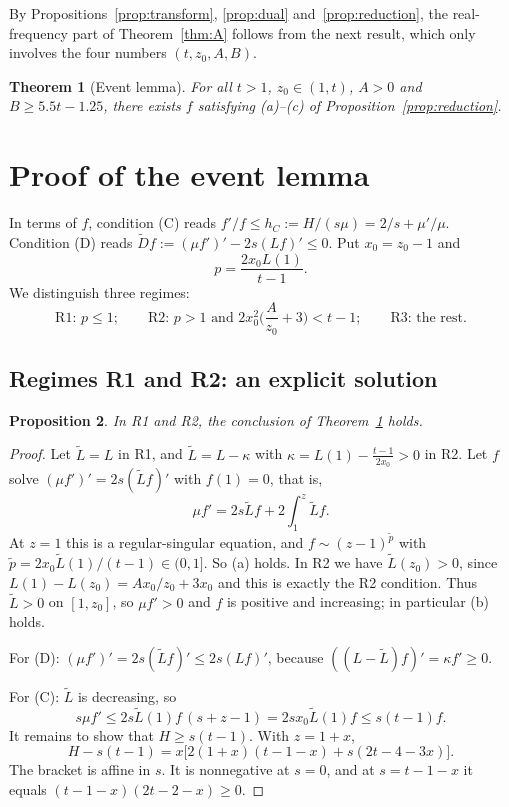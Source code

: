\documentclass[11pt]{amsart}
\newtheorem{theorem}{Theorem}[section]
\newtheorem{proposition}[theorem]{Proposition}
\theoremstyle{definition}
\theoremstyle{remark}
\numberwithin{equation}{section}
\begin{document}
By Propositions~\ref{prop:transform}, \ref{prop:dual} and~\ref{prop:reduction}, the real-frequency part of
Theorem~\ref{thm:A} follows from the next result, which only involves the four numbers $(t,z_0,A,B)$.

\begin{theorem}[Event lemma]\label{thm:event}
For all $t>1$, $z_0\in(1,t)$, $A>0$ and $B\ge5.5t-1.25$, there exists $f$ satisfying (a)--(c) of
Proposition~\ref{prop:reduction}.
\end{theorem}

\section{Proof of the event lemma}\label{sec:event}

In terms of $f$, condition (C) reads $f'/f\le h_C:=H/(s\mu)=2/s+\mu'/\mu$. Condition (D) reads
$\widetilde Df:=(\mu f')'-2s(Lf)'\le0$. Put $x_0=z_0-1$ and
\[
p=\frac{2x_0L(1)}{t-1}.
\]
We distinguish three regimes:
\[
\text{R1: }p\le1;\qquad\text{R2: }p>1\text{ and }2x_0^2\Big(\frac{A}{z_0}+3\Big)<t-1;\qquad\text{R3: the rest.}
\]

\subsection{Regimes R1 and R2: an explicit solution}
\begin{proposition}\label{prop:R12}
In R1 and R2, the conclusion of Theorem~\ref{thm:event} holds.
\end{proposition}
\begin{proof}
Let $\tilde L=L$ in R1, and $\tilde L=L-\kappa$ with $\kappa=L(1)-\frac{t-1}{2x_0}>0$ in R2. Let $f$ solve
$(\mu f')'=2s(\tilde Lf)'$ with $f(1)=0$, that is,
\[
\mu f'=2s\tilde Lf+2\int_1^z\tilde Lf.
\]
At $z=1$ this is a regular-singular equation, and $f\sim(z-1)^{\tilde p}$ with
$\tilde p=2x_0\tilde L(1)/(t-1)\in(0,1]$. So (a) holds. In R2 we have $\tilde L(z_0)>0$, since
$L(1)-L(z_0)=Ax_0/z_0+3x_0$ and this is exactly the R2 condition. Thus $\tilde L>0$ on $[1,z_0]$, so $\mu f'>0$ and
$f$ is positive and increasing; in particular (b) holds.

For (D): $(\mu f')'=2s(\tilde Lf)'\le2s(Lf)'$, because $((L-\tilde L)f)'=\kappa f'\ge0$.

For (C): $\tilde L$ is decreasing, so
\[
s\mu f'\le2s\tilde L(1)f\,(s+z-1)=2sx_0\tilde L(1)f\le s(t-1)f.
\]
It remains to show that $H\ge s(t-1)$. With $z=1+x$,
\[
H-s(t-1)=x\big[2(1+x)(t-1-x)+s(2t-4-3x)\big].
\]
The bracket is affine in $s$. It is nonnegative at $s=0$, and at $s=t-1-x$ it equals $(t-1-x)(2t-2-x)\ge0$.
\end{proof}
\end{document}
